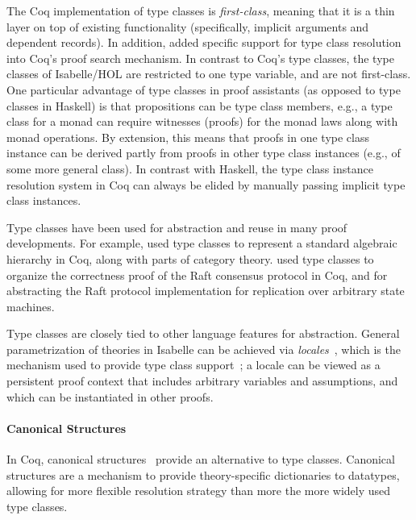 The Coq implementation of type classes is \emph{first-class}, meaning that it is a thin layer on top of existing functionality (specifically, implicit arguments and dependent records). In addition, \cite{Sozeau2008} added specific support for type class resolution into Coq's proof search mechanism. In contrast to Coq's type classes, the type classes of Isabelle/HOL are restricted to one type variable, and are not first-class. One particular advantage of type classes in proof assistants (as opposed to type classes in Haskell) is that propositions can be type class members, e.g., a type class for a monad can require witnesses (proofs) for the monad laws along with monad operations. By extension, this means that proofs in one type class instance can be derived partly from proofs in other type class instances (e.g., of some more general class). In contrast with Haskell,
the type class instance resolution system in Coq can always be elided by manually passing implicit type class instances.

Type classes have been used for abstraction and reuse in many proof developments.
For example, \cite{Spitters2011} used type classes to represent a standard algebraic hierarchy in Coq, along with parts of category theory.
\cite{Woos2016} used type classes to organize the correctness proof of the Raft consensus protocol in Coq, and for abstracting the Raft protocol implementation for replication over arbitrary state machines.

Type classes are closely tied to other language features for abstraction.
General parametrization of theories in Isabelle can be achieved via \emph{locales}~\citep{Kammueller1999,Ballarin2006}, which is the mechanism used to provide type class support~\citep{Haftmann2009}; a locale can be viewed as a persistent proof context that includes arbitrary variables and assumptions, and which can be instantiated in other proofs.



\paragraph{Canonical Structures}
%
In Coq, canonical structures~\citep{Mahboubi-Tassi:ITP13, Saibi:PhD} provide an alternative to type classes.
Canonical structures are a mechanism to provide theory-specific dictionaries to datatypes, allowing for more
flexible resolution strategy than more the more widely used type classes.

